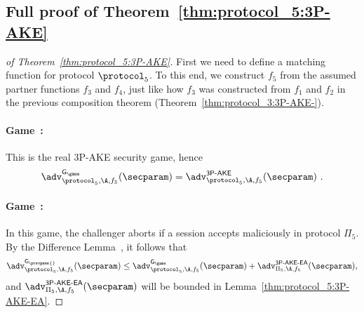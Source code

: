 \subsection{Full proof of Theorem~\ref{thm:protocol_5:3P-AKE}}

\begin{proof}[of Theorem~\ref{thm:protocol_5:3P-AKE}]
First we need to define a matching function for protocol $\protocol_5$.
To this end, we construct $f_5$ from the assumed partner functions $f_3$ and $f_4$,
just like how $f_3$ was constructed from $f_1$ and $f_2$ in the previous composition theorem (Theorem~\ref{thm:protocol_3:3P-AKE-}).
\setcounter{gamehop}{0}
\item
\paragraph{Game~\game:}
This is the real 3P-AKE security game, hence
\begin{equation*}
	\adv_{\protocol_5,\A,f_5}^{\mathsf{G_\game}}(\secparam) = \adv_{\protocol_5{},\A,f_5}^{\operatorname{\mathsf{3P-AKE}}}(\secparam) \ .
\end{equation*}

\newgame
\paragraph{Game~\game:}
In this game, the challenger aborts if a session accepts maliciously in protocol $\Pi_5$.
By the Difference Lemma~\cite{Shoup:2004:sequence_of_games}, it follows that
\begin{equation*}
	\adv_{\protocol_5,\A,f_5}^{\mathsf{G_{\prevgame{}}}}(\secparam) 
	\leq \adv_{\protocol_5,\A,f_5}^{\mathsf{G_\game}}(\secparam) 
	+ \adv_{{\Pi_5},\A,{f_5}}^{\operatorname{\mathsf{3P-AKE-EA}}}(\secparam) ,
\end{equation*}
and $\adv_{{\Pi_5},\A,{f_5}}^{\operatorname{\mathsf{3P-AKE-EA}}}(\secparam)$ will be bounded in Lemma~\ref{thm:protocol_5:3P-AKE-EA}.

\newgame

\end{proof}
